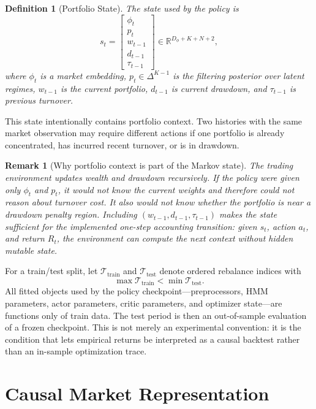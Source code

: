 \documentclass[11pt]{article}
\newtheorem{definition}{Definition}
\newtheorem{remark}{Remark}
\newcommand{\R}{\mathbb{R}}
\newcommand{\1}{\mathbf{1}}
\begin{document}
\begin{definition}[Portfolio State]
The state used by the policy is
\[
s_t =
\begin{bmatrix}
\phi_t \\
p_t \\
w_{t-1} \\
d_{t-1} \\
\tau_{t-1}
\end{bmatrix}
\in \R^{D_\phi + K + N + 2},
\]
where $\phi_t$ is a market embedding, $p_t \in \Delta^{K-1}$ is the filtering
posterior over latent regimes, $w_{t-1}$ is the current portfolio, $d_{t-1}$ is
current drawdown, and $\tau_{t-1}$ is previous turnover.
\end{definition}

This state intentionally contains portfolio context. Two histories with the same
market observation may require different actions if one portfolio is already
concentrated, has incurred recent turnover, or is in drawdown.

\begin{remark}[Why portfolio context is part of the Markov state]
The trading environment updates wealth and drawdown recursively. If the policy
were given only $\phi_t$ and $p_t$, it would not know the current weights and
therefore could not reason about turnover cost. It also would not know whether
the portfolio is near a drawdown penalty region. Including
$(w_{t-1},d_{t-1},\tau_{t-1})$ makes the state sufficient for the implemented
one-step accounting transition: given $s_t$, action $a_t$, and return $R_t$,
the environment can compute the next context without hidden mutable state.
\end{remark}

For a train/test split, let $\mathcal{T}_{\mathrm{train}}$ and
$\mathcal{T}_{\mathrm{test}}$ denote ordered rebalance indices with
\[
\max \mathcal{T}_{\mathrm{train}} < \min \mathcal{T}_{\mathrm{test}}.
\]
All fitted objects used by the policy checkpoint---preprocessors, HMM
parameters, actor parameters, critic parameters, and optimizer state---are
functions only of train data. The test period is then an out-of-sample
evaluation of a frozen checkpoint. This is not merely an experimental
convention: it is the condition that lets empirical returns be interpreted as a
causal backtest rather than an in-sample optimization trace.

\section{Causal Market Representation}
\end{document}
